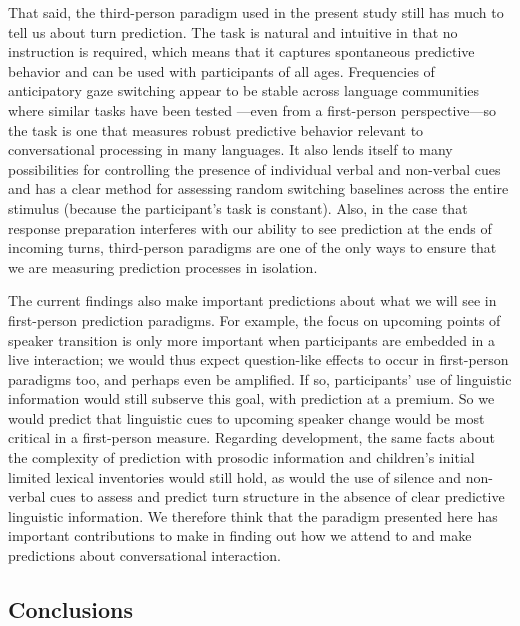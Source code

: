 \documentclass[authoryear, 12pt]{elsarticle}
\begin{document}
That said, the third-person paradigm used in the present study still has much to tell us about turn prediction. The task is natural and intuitive in that no instruction is required, which means that it captures spontaneous predictive behavior and can be used with participants of all ages. Frequencies of anticipatory gaze switching appear to be stable across language communities where similar tasks have been tested \citep{keitel2013, keitel2015, holler2015, hirvenkari2013}---even from a first-person perspective---so the task is one that measures robust predictive behavior relevant to conversational processing in many languages. It also lends itself to many possibilities for controlling the presence of individual verbal and non-verbal cues and has a clear method for assessing random switching baselines across the entire stimulus (because the participant's task is constant). Also, in the case that response preparation interferes with our ability to see prediction at the ends of incoming turns, third-person paradigms are one of the only ways to ensure that we are measuring prediction processes in isolation.

The current findings also make important predictions about what we will see in first-person prediction paradigms. For example, the focus on upcoming points of speaker transition is only more important when participants are embedded in a live interaction; we would thus expect question-like effects to occur in first-person paradigms too, and perhaps even be amplified. If so, participants' use of linguistic information would still subserve this goal, with prediction at a premium. So we would predict that linguistic cues to upcoming speaker change would be most critical in a first-person measure. Regarding development, the same facts about the complexity of prediction with prosodic information and children's initial limited lexical inventories would still hold, as would the use of silence and non-verbal cues to assess and predict turn structure in the absence of clear predictive linguistic information. We therefore think that the paradigm presented here has important contributions to make in finding out how we attend to and make predictions about conversational interaction.


\subsection*{Conclusions}
\end{document}
